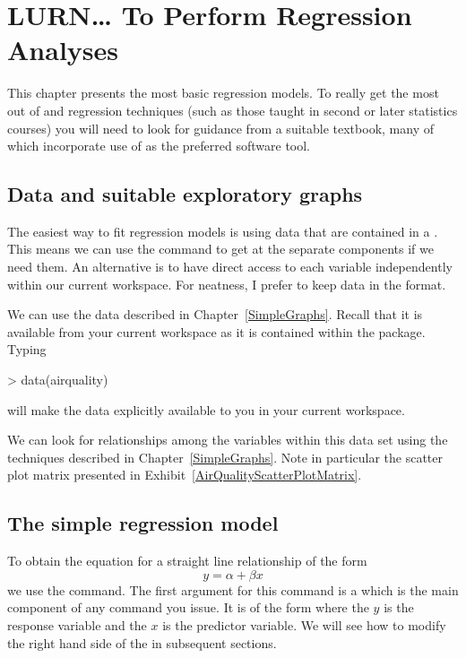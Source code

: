 \chapter{LURN\ldots{} To Perform Regression Analyses}
\label{Regression}




This chapter presents the most basic regression models. To really get the most out of \R{} and regression techniques (such as those taught in second or later statistics courses) you will need to look for guidance from a suitable textbook, many of which incorporate use of \R{} as the preferred software tool.

\section{Data and suitable exploratory graphs}

The easiest way to fit regression models is using data that are contained in a . This means we can use the  command to get at the separate components if we need them. An alternative is to have direct access to each variable independently within our current workspace. For neatness, I prefer to keep data in the  format.

We can use the  data described in Chapter~\ref{SimpleGraphs}. Recall that it is available from your current workspace as it is contained within the  package. Typing
\begin{Schunk}
\begin{Sinput}
> data(airquality)
\end{Sinput}
\end{Schunk}
will make the data explicitly available to you in your current \R{} workspace.

We can look for relationships among the variables within this data set using the techniques described in Chapter~\ref{SimpleGraphs}. Note in particular the scatter plot matrix presented in Exhibit~\ref{AirQualityScatterPlotMatrix}.



\section{The simple regression model}

To obtain the equation for a straight line relationship of the form \begin{equation}
y=\alpha+\beta{}x
\end{equation} we use the  command. The first argument for this command is a  which is the main component of any  command you issue. It is of the form  where the $y$ is the response variable and the $x$ is the predictor variable. We will see how to modify the right hand side of the  in subsequent sections. 


